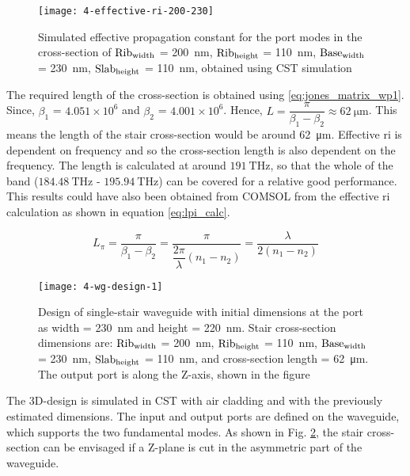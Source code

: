 \documentclass[../report.tex]{subfiles}
\begin{document}
\begin{figure}[H] %
	\centering
	\texttt{[image: 4-effective-ri-200-230]}
	\caption{Simulated effective propagation constant for the port modes in the cross-section of $\mathrm{Rib_{width}}$ = \SI{200}{\nano \meter}, $\mathrm{Rib_{height}}$ = \SI{110}{\nano \meter}, $\mathrm{Base_{width}}$ = \SI{230}{\nano \meter}, $\mathrm{Slab_{height}}$ = \SI{110}{\nano \meter}, obtained using CST simulation}
	\label{fig:4_effective_ri_200_230}
\end{figure}

\noindent The required length of the cross-section is obtained using \ref{eq:jones_matrix_wp1}. Since, $\beta_1$ = $4.051 \times 10^6$  and $\beta_2$ = $4.001 \times 10^6$. Hence, $L = \dfrac{\pi}{\beta_1 - \beta_2} \approx \SI{62}{\micro \meter}$. This means the length of the stair cross-section would be around \SI{62}{\micro \meter}. Effective \gls{ri} is dependent on frequency and so the cross-section length is also dependent on the frequency. The length is calculated at around $\SI{191}{\THz}$, so that the whole of the band ($\SI{184.48}{\THz}$ - $\SI{195.94}{\THz}$) can be covered for a relative good performance. This results could have also been obtained from COMSOL from the effective \gls{ri} calculation as shown in equation \ref{eq:lpi_calc}.

\begin{equation}\label{eq:lpi_calc}
L_\pi =  \dfrac {\pi} {\beta_1 - \beta_2} = \dfrac {\pi} {\dfrac {2\pi} {\lambda}\left(n_1 - n_2\right)} = \dfrac {\lambda} {2(n_1 - n_2)}
\end{equation}

\begin{figure}[H] %
	\centering
	\texttt{[image: 4-wg-design-1]}
	\caption{Design of single-stair waveguide with initial dimensions at the port as width = \SI{230}{\nano \meter} and height = \SI{220}{\nano \meter}. Stair cross-section dimensions are: $\mathrm{Rib_{width}}$ = \SI{200}{\nano \meter}, $\mathrm{Rib_{height}}$ = \SI{110}{\nano \meter}, $\mathrm{Base_{width}}$ = \SI{230}{\nano \meter}, $\mathrm{Slab_{height}}$ = \SI{110}{\nano \meter}, and cross-section length = \SI{62}{\micro\meter}. The output port is along the Z-axis, shown in the figure}
	\label{fig:4_wg_design_1}
\end{figure}

\noindent The 3D-design is simulated in CST with air cladding and with the previously estimated dimensions. The input and output ports are defined on the waveguide, which supports the two fundamental modes. As shown in Fig. \ref{fig:4_wg_design_1}, the stair cross-section can be envisaged if a Z-plane is cut in the asymmetric part of the waveguide.\\
\end{document}
